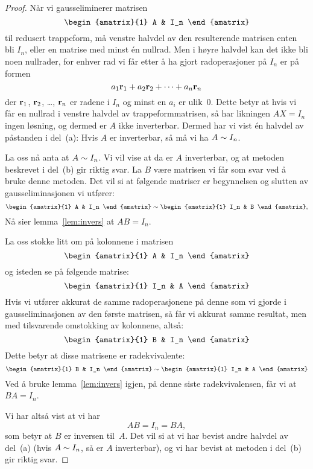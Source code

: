 \begin{proof}
Når vi gausseliminerer matrisen
\[
\begin{amatrix}{1} A & I_n \end{amatrix}
\]
til redusert trappeform, må venstre halvdel av den resulterende
matrisen enten bli $I_n$, eller en matrise med minst én nullrad.  Men
i høyre halvdel kan det ikke bli noen nullrader, for enhver rad vi får
etter å ha gjort radoperasjoner på $I_n$ er på formen
\[
a_1 \mathbf{r}_1 + a_2 \mathbf{r}_2 + \cdots + a_n \mathbf{r}_n
\]
der $\mathbf{r}_1$, $\mathbf{r}_2$, \ldots, $\mathbf{r}_n$ er radene i $I_n$ og minst
en $a_i$ er ulik~$0$.  Dette betyr at hvis vi får en nullrad i venstre
halvdel av trappeformmatrisen, så har likningen $AX = I_n$ ingen
løsning, og dermed er $A$ ikke inverterbar.  Dermed har vi vist én
halvdel av påstanden i del~(a): Hvis $A$ er inverterbar, så må vi ha
$A \sim I_n$.

La oss nå anta at $A \sim I_n$.  Vi vil vise at da er $A$
inverterbar, og at metoden beskrevet i del~(b) gir riktig svar.  La
$B$ være matrisen vi får som svar ved å bruke denne metoden.  Det vil
si at følgende matriser er begynnelsen og slutten av
gausseliminasjonen vi utfører:
\[
\begin{amatrix}{1} A & I_n \end{amatrix}
\roweq
\begin{amatrix}{1} I_n & B \end{amatrix},
\]
Nå sier lemma~\ref{lem:invers} at $AB = I_n$.

La oss stokke litt om på kolonnene i matrisen
\[
\begin{amatrix}{1} A & I_n \end{amatrix}
\]
og isteden se på følgende matrise:
\[
\begin{amatrix}{1} I_n & A \end{amatrix}
\]
Hvis vi utfører akkurat de samme radoperasjonene på denne som vi
gjorde i gausseliminasjonen av den første matrisen, så får vi akkurat
samme resultat, men med tilsvarende omstokking av kolonnene, altså:
\[
\begin{amatrix}{1} B & I_n \end{amatrix}
\]
Dette betyr at disse matrisene er radekvivalente:
\[
\begin{amatrix}{1} B & I_n \end{amatrix}
\roweq
\begin{amatrix}{1} I_n & A \end{amatrix}
\]
Ved å bruke lemma~\ref{lem:invers} igjen, på denne siste
radekvivalensen, får vi at $BA = I_n$.

Vi har altså vist at vi har
\[
AB = I_n = BA,
\]
som betyr at $B$ er inversen til~$A$.  Det vil si at vi har bevist
andre halvdel av del~(a) (hvis $A \sim I_n$, så er $A$ inverterbar),
og vi har bevist at metoden i del~(b) gir riktig svar.
\end{proof}

